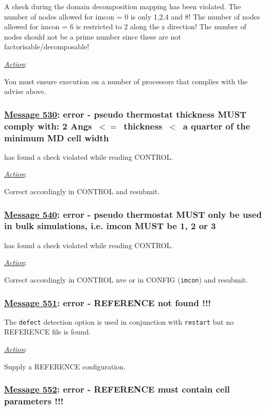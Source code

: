 A \D check during the domain decomposition mapping has been violated.
The number of nodes allowed for imcon = 0 is only 1,2,4 and 8!
The number of nodes allowed for imcon = 6 is restricted to 2 along the
z direction!  The number of nodes should not be a prime number since
these are not factorisable/decomposable!

\noindent \underline{\em Action}:

You must ensure \D execution on a number of processors that complies
with the advise above.

\subsubsection*{\underline{Message 530}: error - pseudo thermostat thickness MUST comply with: 2 Angs~$<=$~thickness~$<$~a quarter of the minimum MD cell width}

\D has found a check violated while reading CONTROL.

\noindent \underline{\em Action}:

Correct accordingly in CONTROL and resubmit.

\subsubsection*{\underline{Message 540}: error - pseudo thermostat MUST only be used in bulk simulations, i.e. imcon MUST be 1, 2 or 3}

\D has found a check violated while reading CONTROL.

\noindent \underline{\em Action}:

Correct accordingly in CONTROL {nve} or in CONFIG ({\tt imcon})
and resubmit.

\subsubsection*{\underline{Message 551}: error - REFERENCE not found !!!}

The {\tt defect} detection option is used in conjunction with {\tt restart}
but no REFERENCE file is found.

\noindent \underline{\em Action}:

Supply a REFERENCE configuration.

\subsubsection*{\underline{Message 552}: error - REFERENCE must contain cell parameters !!!}

